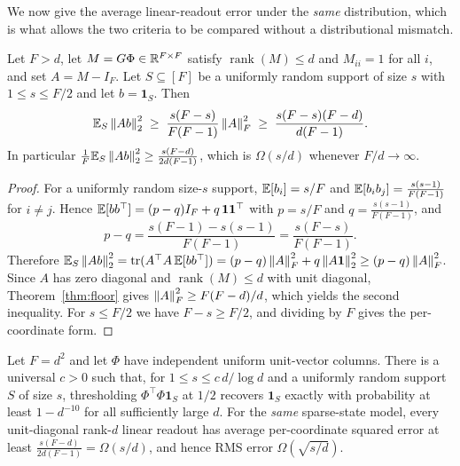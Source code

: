We now give the average linear-readout error under the \emph{same} distribution, which is what
allows the two criteria to be compared without a distributional mismatch.

\begin{proposition}
\label{prop:uniform-energy}
Let $F>d$, let $M=G\Phi\in\mathbb{R}^{F\times F}$ satisfy $\operatorname{rank}(M)\le d$ and $M_{ii}=1$
for all $i$, and set $A=M-I_F$. Let $S\subseteq[F]$ be a uniformly random support of size $s$
with $1\le s\le F/2$ and let $b=\mathbf 1_S$. Then
\begin{equation}
  \mathbb{E}_S\left\lVert Ab \right\rVert_2^2
  \;\ge\;\frac{s(F-s)}{F(F-1)}\left\lVert A \right\rVert_F^2
  \;\ge\;\frac{s(F-s)(F-d)}{d(F-1)} .
  \label{eq:energyfloor}
\end{equation}
In particular $\frac1F\mathbb{E}_S\left\lVert Ab \right\rVert_2^2\ge\frac{s(F-d)}{2d(F-1)}$, which is $\Omega(s/d)$
whenever $F/d\to\infty$.
\end{proposition}

\begin{proof}
For a uniformly random size-$s$ support, $\mathbb{E}[b_i]=s/F$ and $\mathbb{E}[b_ib_j]=\frac{s(s-1)}{F(F-1)}$
for $i\neq j$. Hence $\mathbb{E}[bb^{\top}]=(p-q)I_F+q\,\mathbf 1\mathbf 1^{\top}$ with $p=s/F$ and
$q=\frac{s(s-1)}{F(F-1)}$, and
\[
  p-q=\frac{s(F-1)-s(s-1)}{F(F-1)}=\frac{s(F-s)}{F(F-1)} .
\]
Therefore
$\mathbb{E}_S\left\lVert Ab \right\rVert_2^2=\operatorname{tr}(A^{\top}A\,\mathbb{E}[bb^{\top}])
=(p-q)\left\lVert A \right\rVert_F^2+q\left\lVert A\mathbf 1 \right\rVert_2^2\ge(p-q)\left\lVert A \right\rVert_F^2$.
Since $A$ has zero diagonal and $\operatorname{rank}(M)\le d$ with unit diagonal,
Theorem~\ref{thm:floor} gives $\left\lVert A \right\rVert_F^2\ge F(F-d)/d$, which yields the second inequality.
For $s\le F/2$ we have $F-s\ge F/2$, and dividing by $F$ gives the per-coordinate form.
\end{proof}

\begin{corollary}
\label{cor:separation}
Let $F=d^2$ and let $\Phi$ have independent uniform unit-vector columns. There is a universal
$c>0$ such that, for $1\le s\le c\,d/\log d$ and a uniformly random support $S$ of size $s$,
thresholding $\Phi^{\top}\Phi\mathbf 1_S$ at $1/2$ recovers $\mathbf 1_S$ exactly with
probability at least $1-d^{-10}$ for all sufficiently large $d$. For the \emph{same} sparse-state
model, every unit-diagonal rank-$d$ linear readout has average per-coordinate squared error at
least $\frac{s(F-d)}{2d(F-1)}=\Omega(s/d)$, and hence RMS error $\Omega(\sqrt{s/d})$.
\end{corollary}

